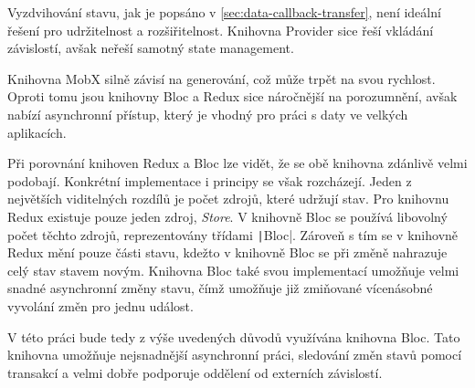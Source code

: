 Vyzdvihování stavu,
jak je popsáno v \ref{sec:data-callback-transfer},
není ideální řešení pro udržitelnost a rozšiřitelnost.
Knihovna Provider sice řeší vkládání závislostí,
avšak neřeší samotný state management.

Knihovna MobX silně závisí na generování,
což může trpět na svou rychlost.
Oproti tomu jsou knihovny Bloc a Redux sice náročnější na porozumnění,
avšak nabízí asynchronní přístup,
který je vhodný pro práci s daty ve velkých aplikacích.

Při porovnání knihoven Redux a Bloc lze vidět,
že se obě knihovna zdánlivě velmi podobají.
Konkrétní implementace i principy se však rozcházejí.
Jeden z největších viditelných rozdílů je počet zdrojů,
které udržují stav.
Pro knihovnu Redux existuje pouze jeden zdroj, \emph{Store}.
V knihovně Bloc se používá libovolný počet těchto zdrojů,
reprezentovány třídami \texttt|Bloc|.
Zároveň s tím se v knihovně Redux mění pouze části stavu,
kdežto v knihovně Bloc se při změně nahrazuje celý stav stavem novým.
Knihovna Bloc také svou implementací umožňuje velmi snadné asynchronní změny
stavu,
čímž umožňuje již zmiňované vícenásobné vyvolání změn pro jednu událost.

V této práci bude tedy z výše uvedených důvodů využívána knihovna Bloc.
Tato knihovna umožňuje nejsnadnější asynchronní práci,
sledování změn stavů pomocí transakcí
a velmi dobře podporuje oddělení od externích závislostí.
